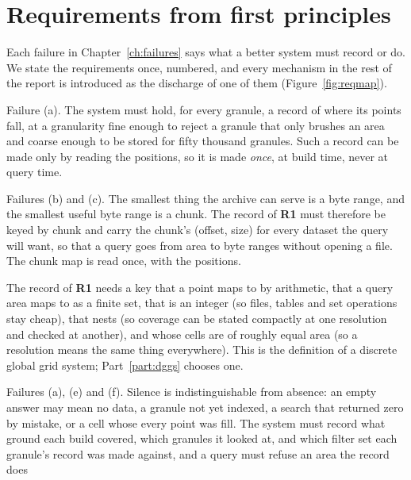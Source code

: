 \documentclass[10pt,a4paper]{article}
\newcommand{\req}[1]{\textbf{R#1}}
\begin{document}
\section{Requirements from first principles}
\label{ch:requirements}

Each failure in Chapter~\ref{ch:failures} says what a better system must record or do. We state the requirements
once, numbered, and every mechanism in the rest of the report is introduced as the discharge of one of them
(Figure~\ref{fig:reqmap}).

\begin{description}\setlength{\itemsep}{3pt}
\item[\req{1} Search by where the points are, not where the track was.] Failure (a). The system must hold, for every
  granule, a record of where its points fall, at a granularity fine enough to reject a granule that only brushes an
  area and coarse enough to be stored for fifty thousand granules. Such a record can be made only by reading the
  positions, so it is made \emph{once}, at build time, never at query time.
\item[\req{2} Retrieve by the storage unit.] Failures (b) and (c). The smallest thing the archive can serve is a
  byte range, and the smallest useful byte range is a chunk. The record of \req{1} must therefore be keyed by chunk
  and carry the chunk's (offset, size) for every dataset the query will want, so that a query goes from area to
  byte ranges without opening a file. The chunk map is read once, with the positions.
\item[\req{3} A discrete, hierarchical, integer spatial key.] The record of \req{1} needs a key that a point maps
  to by arithmetic, that a query area maps to as a finite set, that is an integer (so files, tables and set
  operations stay cheap), that nests (so coverage can be stated compactly at one resolution and checked at another),
  and whose cells are of roughly equal area (so a resolution means the same thing everywhere). This is the
  definition of a discrete global grid system; Part~\ref{part:dggs} chooses one.
\item[\req{4} Completeness must be provable.] Failures (a), (e) and (f). Silence is indistinguishable from
  absence: an empty answer may mean no data, a granule not yet indexed, a search that returned zero by mistake, or a
  cell whose every point was fill. The system must record what ground each build covered, which granules it looked
  at, and which filter set each granule's record was made against, and a query must refuse an area the record does

\end{description}
\end{document}
